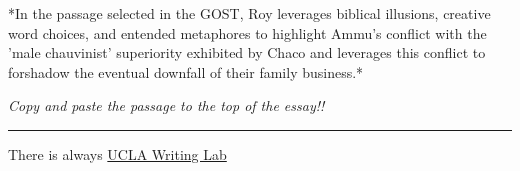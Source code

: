 \documentclass[letterpaper]{article}
\begin{document}
*In the passage selected in the GOST, Roy leverages biblical illusions,
creative word choices, and entended metaphores to highlight Ammu's
conflict with the 'male chauvinist' superiority exhibited by Chaco and
leverages this conflict to forshadow the eventual downfall of their
family business.*

\emph{Copy and paste the passage to the top of the essay!!}

\noindent\rule{\textwidth}{0.5pt}

There is always
\href{https://wp.ucla.edu/wp-content/uploads/2016/01/UWC\_handouts\_What-How-So-What-Thesis-revised-5-4-15-RZ.pdf}{UCLA
Writing Lab}
\end{document}
